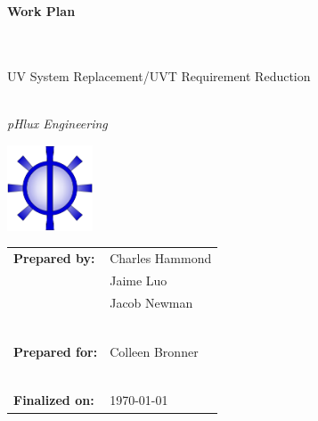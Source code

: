 \documentclass[11pt,letterpaper,final]{report}
\author{Charles Hammond \\ Jaime Luo \\ Jacob Newman}
\begin{document}
\begin{center}

\begin{huge} 

\begin{Huge}\textbf{Work Plan} \end{Huge} \\~\\  UV System Replacement/UVT Requirement Reduction \\~\\
\end{huge}


\begin{Large} \textit{pHlux Engineering} \end{Large}



\begin{large}

\vspace{100pt}
\includegraphics[height=1in]{WP}\\
\end{large}

\vspace{100pt}


\begin{tabular}{ll}
    \textbf{Prepared by:}&Charles Hammond\\
                         & Jaime Luo\\
                         & Jacob Newman\\
                         & \\~\\
    \textbf{Prepared for:}& Colleen Bronner\\
                         & \\~\\
    \textbf{Finalized on:}& \today\\ 

\end{tabular}

\end{center}



\newpage
\setcounter{page}{0}
\end{document}
